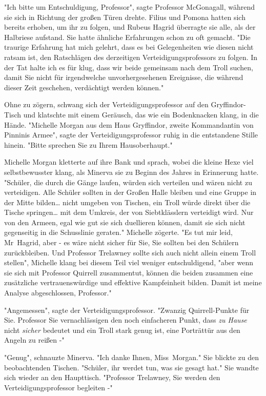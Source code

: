 {"Ich bitte um Entschuldigung, Professor", sagte Professor McGonagall, während sie sich in Richtung der großen Türen drehte. Filius und Pomona hatten sich bereits erhoben, um ihr zu folgen, und Rubeus Hagrid überragte sie alle, als der Halbriese aufstand. Sie hatte ähnliche Erfahrungen schon zu oft gemacht. "Die traurige Erfahrung hat mich gelehrt, dass es bei Gelegenheiten wie diesen nicht ratsam ist, den Ratschlägen des derzeitigen Verteidigungsprofessors zu folgen. In der Tat halte ich es für klug, dass wir beide gemeinsam nach dem Troll suchen, damit Sie nicht für irgendwelche unvorhergesehenen Ereignisse, die während dieser Zeit geschehen, verdächtigt werden können."

Ohne zu zögern, schwang sich der Verteidigungsprofessor auf den Gryffindor-Tisch und klatschte mit einem Geräusch, das wie ein Bodenknacken klang, in die Hände. "Michelle Morgan aus dem Haus Gryffindor, zweite Kommandantin von Pinninis Armee", sagte der Verteidigungsprofessor ruhig in die entstandene Stille hinein. "Bitte sprechen Sie zu Ihrem Hausoberhaupt."

Michelle Morgan kletterte auf ihre Bank und sprach, wobei die kleine Hexe viel selbstbewusster klang, als Minerva sie zu Beginn des Jahres in Erinnerung hatte. "Schüler, die durch die Gänge laufen, würden sich verteilen und wären nicht zu verteidigen. Alle Schüler sollten in der Großen Halle bleiben und eine Gruppe in der Mitte bilden… nicht umgeben von Tischen, ein Troll würde direkt über die Tische springen… mit dem Umkreis, der von Siebtklässlern verteidigt wird. Nur von den Armeen, egal wie gut sie sich duellieren können, damit sie sich nicht gegenseitig in die Schusslinie geraten." Michelle zögerte. "Es tut mir leid, Mr~Hagrid, aber - es wäre nicht sicher für Sie, Sie sollten bei den Schülern zurückbleiben. Und Professor Trelawney sollte sich auch nicht allein einem Troll stellen", Michelle klang bei diesem Teil viel weniger entschuldigend, "aber wenn sie sich mit Professor Quirrell zusammentut, können die beiden zusammen eine zusätzliche vertrauenswürdige und effektive Kampfeinheit bilden. Damit ist meine Analyse abgeschlossen, Professor."

"Angemessen", sagte der Verteidigungsprofessor. "Zwanzig Quirrell-Punkte für Sie. Professor Sie vernachlässigen den noch einfacheren Punkt, dass \emph{zu Hause} nicht \emph{sicher} bedeutet und ein Troll stark genug ist, eine Porträttür aus den Angeln zu reißen -"

"Genug", schnauzte Minerva. "Ich danke Ihnen, Miss~Morgan." Sie blickte zu den beobachtenden Tischen. "Schüler, ihr werdet tun, was sie gesagt hat." Sie wandte sich wieder an den Haupttisch. "Professor Trelawney, Sie werden den Verteidigungsprofessor begleiten -"

}
